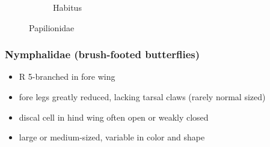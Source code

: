 \documentclass[letterpaper, 11pt]{article}
\begin{document}
\begin{figure}[ht!]
\begin{subfigure}[ht!]{0.5\textwidth}
        \caption{Habitus}
        \label{fig:papilionid2}
    \end{subfigure}
    \caption{Papilionidae}\label{fig:papilionids}
\end{figure}

\subsubsection{Nymphalidae (brush-footed butterflies)}
\begin{itemize}
\item R 5-branched in fore wing
\item fore legs greatly reduced, lacking tarsal claws (rarely normal sized)
\item discal cell in hind wing often open or weakly closed
\item large or medium-sized, variable in color and shape
\end{itemize}
\end{document}
